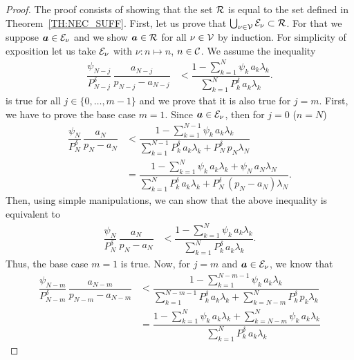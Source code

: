 \begin{proof}
	The proof consists of showing that the set $\cal{R}$ is equal to the set defined in Theorem~\ref{TH:NEC_SUFF}.
    First, let us prove that $\bigcup_{\nu\in\cal{V}} \cal{E}_\nu \subset \cal{R}$.
    For that we suppose $\bm{a} \in \cal{E}_\nu$ and we show $\bm{a} \in \cal{R}$ for all $\nu\in\cal{V}$ by induction.
    For simplicity of exposition let us take $\cal{E}_\nu$ with $\nu: n \longmapsto n$, $n\in\cal{C}$.
    We assume the inequality
    \begin{align}
        \dfrac{\psi_{N-j}}{P_{N-j}^\delta}\,\dfrac{a_{N-j}}{p_{N-j}-a_{N-j}} 
        & < \dfrac{1 - \sum_{k=1}^{N} \psi_k\,a_k \lambda_k}{\sum_{k=1}^{N} P_k^\delta\,a_k\lambda_k}. \label{eq:th2_basecase}
    \end{align}
    is true for all $j\in\{0,\dots,m-1\}$ and we prove that it is also true for $j=m$.
    First, we have to prove the base case $m = 1$.
    Since $\bm{a}\in \cal{E}_\nu$, then for $j=0$ ($n=N$)
    \begin{align*}
        	\dfrac{\psi_N}{P_N^\delta}\,\dfrac{a_N}{p_N-a_N} 
        	& < \dfrac{1 - \sum_{k=1}^{N-1} \psi_k\,a_k \lambda_k}{\sum_{k=1}^{N-1} P_k^\delta\,a_k\lambda_k + P_N^\delta\,p_N\lambda_N} \\
        & = \dfrac{1 - \sum_{k=1}^{N} \psi_k\,a_k \lambda_k + \psi_N\,a_N \lambda_N}{\sum_{k=1}^{N} P_k^\delta\,a_k\lambda_k + P_N^\delta\,(p_N-a_N)\lambda_N}.
    \end{align*}
    Then, using simple manipulations, we can show that the above inequality is equivalent to
    \begin{align*}
        	\dfrac{\psi_N}{P_N^\delta}\,\dfrac{a_N}{p_N-a_N} 
        	& < \dfrac{1 - \sum_{k=1}^{N} \psi_k\,a_k \lambda_k}{\sum_{k=1}^{N} P_k^\delta\,a_k\lambda_k}.
    \end{align*}
    Thus, the base case $m = 1$ is true.
    Now, for $j=m$ and $\bm{a}\in \cal{E}_\nu$, we know that
    \begin{align*}
        \dfrac{\psi_{N-m}}{P_{N-m}^\delta}\,\dfrac{a_{N-m}}{p_{N-m}-a_{N-m}}
        & < \dfrac{1 - \sum_{k=1}^{N-m-1} \psi_k\,a_k \lambda_k}
        	{\sum_{k=1}^{N-m-1} P_k^\delta\,a_k\lambda_k 
        	    + \sum_{k=N-m}^{N} P_k^\delta\,p_k\lambda_k} \\
        & = \dfrac{1 - \sum_{k=1}^{N} \psi_k\,a_k \lambda_k 
                + \sum_{k=N-m}^{N} \psi_k\,a_k \lambda_k}
            {\sum_{k=1}^{N} P_k^\delta\,a_k\lambda_k 
}
\end{align*}
\end{proof}
